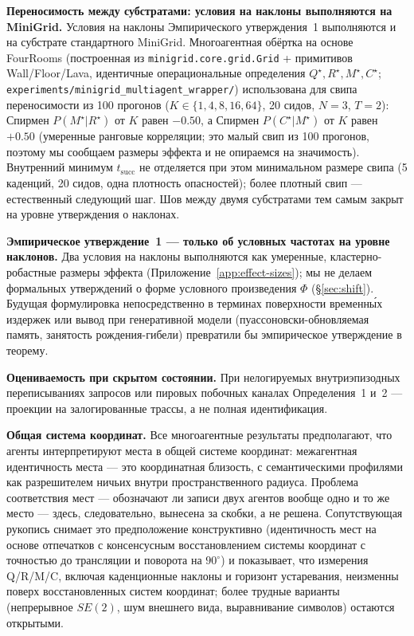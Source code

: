 \documentclass{article}
\begin{document}
\textbf{Переносимость между субстратами: условия на наклоны выполняются на MiniGrid.} Условия на наклоны Эмпирического утверждения~1 выполняются и на субстрате стандартного MiniGrid. Многоагентная обёртка на основе FourRooms (построенная из \texttt{minigrid.core.grid.Grid} + примитивов Wall/Floor/Lava, идентичные операциональные определения $Q^\star,R^\star,M^\star,C^\star$; \texttt{experiments/minigrid\_multiagent\_wrapper/}) использована для свипа переносимости из 100 прогонов ($K{\in}\{1,4,8,16,64\}$, 20 сидов, $N{=}3$, $T{=}2$): Спирмен $P(M^\star|R^\star)$ от $K$ равен $-0.50$, а Спирмен $P(C^\star|M^\star)$ от $K$ равен $+0.50$ (умеренные ранговые корреляции; это малый свип из 100 прогонов, поэтому мы сообщаем размеры эффекта и не опираемся на значимость). Внутренний минимум $t_{\mathrm{succ}}$ не отделяется при этом минимальном размере свипа (5 каденций, 20 сидов, одна плотность опасностей); более плотный свип --- естественный следующий шаг. Шов между двумя субстратами тем самым закрыт на уровне утверждения о наклонах.

\textbf{Эмпирическое утверждение~1 --- только об условных частотах на уровне наклонов.} Два условия на наклоны выполняются как умеренные, кластерно-робастные размеры эффекта (Приложение~\ref{app:effect-sizes}); мы не делаем формальных утверждений о форме условного произведения $\Phi$ (\S\ref{sec:shift}). Будущая формулировка непосредственно в терминах поверхности временн\'{ы}х издержек или вывод при генеративной модели (пуассоновски-обновляемая память, занятость рождения-гибели) превратили бы эмпирическое утверждение в теорему.

\textbf{Оцениваемость при скрытом состоянии.} При нелогируемых внутриэпизодных переписываниях запросов или пировых побочных каналах Определения~1 и~2 --- проекции на залогированные трассы, а не полная идентификация.

\textbf{Общая система координат.} Все многоагентные результаты предполагают, что агенты
интерпретируют места в общей системе координат: межагентная идентичность
места --- это координатная близость, с семантическими профилями как
разрешителем ничьих внутри пространственного радиуса. Проблема соответствия мест ---
обозначают ли записи двух агентов вообще одно и то же место ---
здесь, следовательно, вынесена за скобки, а не решена. Сопутствующая рукопись снимает
это предположение конструктивно (идентичность мест на основе отпечатков с
консенсусным восстановлением системы координат с точностью до трансляции и поворота на $90^\circ$)
и показывает, что измерения Q/R/M/C, включая каденционные наклоны и
горизонт устаревания, неизменны поверх восстановленных систем координат; более трудные
варианты (непрерывное $SE(2)$, шум внешнего вида, выравнивание
символов) остаются открытыми.
\end{document}
